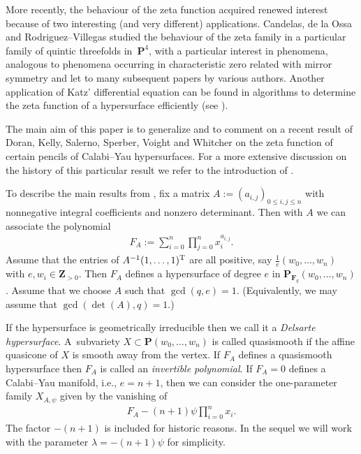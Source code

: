 \documentclass[pdftex]{sigma}
\numberwithin{equation}{section}
\begin{document}
More recently, the behaviour of the zeta function acquired renewed interest because of two interesting (and very dif\/ferent) applications. Candelas, de la Ossa and Rodriguez--Villegas \cite{Cand2} studied the behaviour of the zeta family in a particular family of quintic threefolds in~$\mathbf{P}^4$, with a particular interest in phenomena, analogous to phenomena occurring in characteristic zero related with mirror symmetry and let to many subsequent papers by various authors. Another application of Katz' dif\/ferential equation can be found in algorithms to determine the zeta function of a hypersurface ef\/f\/iciently (see \cite{LauDefT,PanTui}).

The main aim of this paper is to generalize and to comment on a recent result of Doran, Kelly, Salerno, Sperber, Voight and Whitcher \cite{DKSSVW} on the zeta function of certain pencils of Calabi--Yau hypersurfaces. For a more extensive discussion on the history of this particular result we refer to the introduction of \cite{DKSSVW}.

To describe the main results from \cite{DKSSVW}, f\/ix a matrix $A:=(a_{i,j})_{0\leq i,j\leq n}$ with nonnegative integral coef\/f\/icients and nonzero determinant. Then with $A$ we can associate the polynomial
\begin{gather*} F_A:=\sum_{i=0}^n\prod_{j=0}^n x_i^{a_{i,j}}.\end{gather*}
Assume that the entries of $A^{-1} (1,\dots,1)^{\rm T}$ are all positive, say $\frac{1}{e}(w_0,\dots,w_n)$ with $e,w_i\in \mathbf{Z}_{>0}$. Then $F_A$ def\/ines a hypersurface of degree $e$ in $\mathbf{P}_{\mathbf{F}_q}(w_0,\dots,w_n)$. Assume that we choose $A$ such that $\gcd(q,e)=1$. (Equivalently, we may assume that $\gcd(\det(A),q)=1$.)

If the hypersurface is geometrically irreducible then we call it a \emph{Delsarte hypersurface}. A~subvariety $X\subset \mathbf{P}(w_0,\dots,w_n)$ is called quasismooth if the af\/f\/ine quasicone of $X$ is smooth away from the vertex. If $F_A$ def\/ines a quasismooth hypersurface then $F_A$ is called an \emph{invertible polynomial}. If $F_A=0$ def\/ines a Calabi--Yau manifold, i.e., $e=n+1$, then we can consider the one-parameter family $X_{A,\psi}$ given by the vanishing of
\begin{gather*} F_A-(n+1)\psi \prod_{i=0}^n x_i.\end{gather*}
The factor $-(n+1)$ is included for historic reasons. In the sequel we will work with the parameter $\lambda=-(n+1)\psi$ for simplicity.
\end{document}
